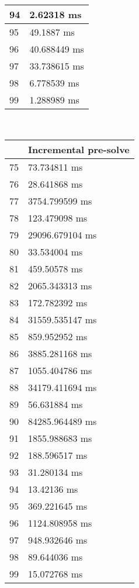 \begin{multicols}{2}
\begin{tabular}{|l|l|}
		94 & 2.62318 ms \\ \hline
		95 & 49.1887 ms \\ \hline
		96 & 40.688449 ms \\ \hline
		97 & 33.738615 ms \\ \hline
		98 & 6.778539 ms \\ \hline
		99 & 1.288989 ms \\ \hline
	\end{tabular}\\
	\begin{tabular}{|l|l|}
		\hline
		& Incremental pre-solve \\ \hline
		75 & 73.734811 ms \\ \hline
		76 & 28.641868 ms \\ \hline
		77 & 3754.799599 ms \\ \hline
		78 & 123.479098 ms \\ \hline
		79 & 29096.679104 ms \\ \hline
		80 & 33.534004 ms \\ \hline
		81 & 459.50578 ms \\ \hline
		82 & 2065.343313 ms \\ \hline
		83 & 172.782392 ms \\ \hline
		84 & 31559.535147 ms \\ \hline
		85 & 859.952952 ms \\ \hline
		86 & 3885.281168 ms \\ \hline
		87 & 1055.404786 ms \\ \hline
		88 & 34179.411694 ms \\ \hline
		89 & 56.631884 ms \\ \hline
		90 & 84285.964489 ms \\ \hline
		91 & 1855.988683 ms \\ \hline
		92 & 188.596517 ms \\ \hline
		93 & 31.280134 ms \\ \hline
		94 & 13.42136 ms \\ \hline
		95 & 369.221645 ms \\ \hline
		96 & 1124.808958 ms \\ \hline
		97 & 948.932646 ms \\ \hline
		98 & 89.644036 ms \\ \hline
		99 & 15.072768 ms \\ \hline
	\end{tabular}\\
	\begin{tabular}{|l|l|}

\end{tabular}
\end{multicols}
